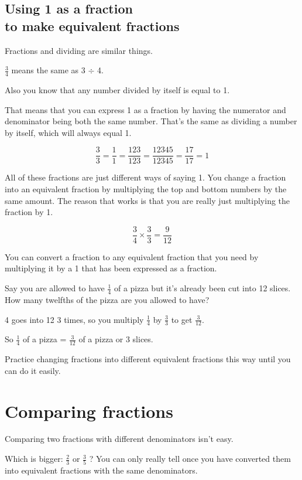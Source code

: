 \documentclass[16pt]{article}
\begin{document}
\begin{spacing}{1.25}
\pagebreak

\subsection*{Using 1 as a fraction\\to make equivalent fractions}
Fractions and dividing are similar things.

$\frac{3}{4}$ means the same as 3 $\div$ 4.

Also you know that any number divided by itself is equal to 1.

That means that you can express 1 as a fraction by having the numerator and denominator being both the same number. That's the same as dividing a number by itself, which will always equal 1.

$$\frac{3}{3} = \frac{1}{1} = \frac{123}{123} = \frac{12345}{12345} = \frac{17}{17} = 1$$

All of these fractions are just different ways of saying 1. You change a fraction into an equivalent fraction by multiplying the top and bottom numbers by the same amount. The reason that works is that you are really just multiplying the fraction by 1.

$$\frac{3}{4} \times \frac{3}{3} = \frac{9}{12}$$

You can convert a fraction to any equivalent fraction that you need by multiplying it by a 1 that has been expressed as a fraction.

Say you are allowed to have $\frac{1}{4}$ of a pizza but it's already been cut into 12 slices. How many twelfths of the pizza are you allowed to have?

4 goes into 12 3 times, so you multiply $\frac{1}{4}$ by $\frac{3}{3}$ to get $\frac{3}{12}$.

So $\frac{1}{4}$ of a pizza = $\frac{3}{12}$ of a pizza or 3 slices.

\vspace{28pt}
Practice changing fractions into different equivalent fractions this way until you can do it easily.

\pagebreak

\section{Comparing fractions}
Comparing two fractions with different denominators isn’t easy.

Which is bigger: $\frac{2}{3}$ or $\frac{3}{5}$ ? You can only really tell once you have converted them into equivalent fractions with the same denominators.


\end{spacing}
\end{document}
